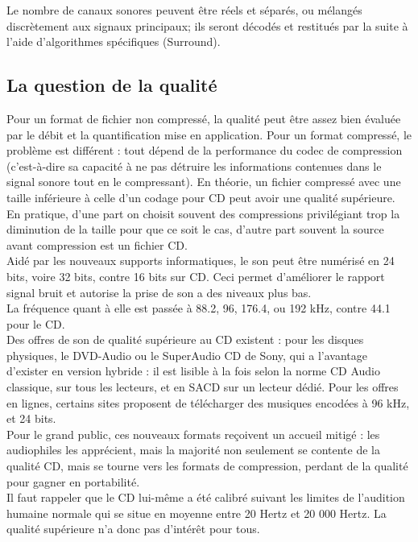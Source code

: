 \documentclass[12pt]{report}
\begin{document}
Le nombre de canaux sonores peuvent être réels et séparés, ou mélangés discrètement aux signaux principaux; ils seront décodés et restitués par la suite à l'aide d'algorithmes spécifiques (Surround).\\


\subsection{La question de la qualité}
Pour un format de fichier non compressé, la qualité peut être assez bien évaluée par le débit et la quantification mise en application. Pour un format compressé, le problème est différent : tout dépend de la performance du codec de compression (c'est-à-dire sa capacité à ne pas détruire les informations contenues dans le signal sonore tout en le compressant). En théorie, un fichier compressé avec une taille inférieure à celle d'un codage pour CD peut avoir une qualité supérieure. En pratique, d'une part on choisit souvent des compressions privilégiant trop la diminution de la taille pour que ce soit le cas, d'autre part souvent la source avant compression est un fichier CD.\\

Aidé par les nouveaux supports informatiques, le son peut être numérisé en 24 bits, voire 32 bits, contre 16 bits sur CD. Ceci permet d'améliorer le rapport signal bruit et autorise la prise de son a des niveaux plus bas.\\

La fréquence quant à elle est passée à 88.2, 96, 176.4, ou 192 kHz, contre 44.1 pour le CD.\\

Des offres de son de qualité supérieure au CD existent : pour les disques physiques, le DVD-Audio ou le SuperAudio CD de Sony, qui a l'avantage d'exister en version hybride : il est lisible à la fois selon la norme CD Audio classique, sur tous les lecteurs, et en SACD sur un lecteur dédié. Pour les offres en lignes, certains sites proposent de télécharger des musiques encodées à 96 kHz, et 24 bits.\\

Pour le grand public, ces nouveaux formats reçoivent un accueil mitigé : les audiophiles les apprécient, mais la majorité non seulement se contente de la qualité CD, mais se tourne vers les formats de compression, perdant de la qualité pour gagner en portabilité.\\

Il faut rappeler que le CD lui-même a été calibré suivant les limites de l'audition humaine normale qui se situe en moyenne entre 20 Hertz et 20 000 Hertz. La qualité supérieure n'a donc pas d'intérêt pour tous.\\
\end{document}
